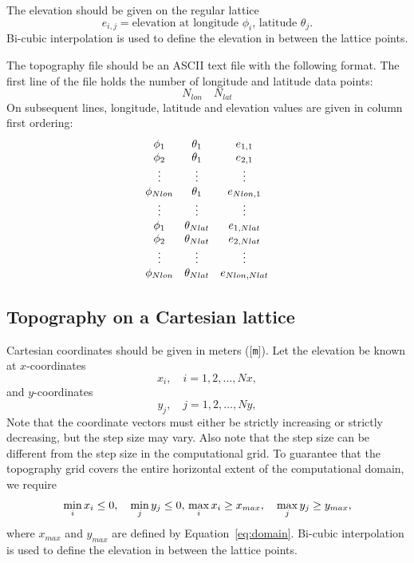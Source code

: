 \documentclass[11pt]{report}
\begin{document}
{The elevation should be given on the regular lattice
\[
	e_{i,j} = \mbox{elevation at longitude $\phi_i$, latitude $\theta_j$.}
\]
Bi-cubic interpolation is used to define the elevation in between the lattice points.

The topography file should be an ASCII text file with the following format. The first line of the
file holds the number of longitude and latitude data points:
\[
	N_{lon}\quad N_{lat}
\]
On subsequent lines, longitude, latitude and elevation values are given in column first ordering:
\[
	\begin{array}{c c c}
		\phi_1      & \theta_1      & e_{1,1}       \\
		\phi_2      & \theta_1      & e_{2,1}       \\
		\vdots      & \vdots        & \vdots        \\
		\phi_{Nlon} & \theta_1      & e_{Nlon,1}    \\
		\vdots      & \vdots        & \vdots        \\
		\phi_1      & \theta_{Nlat} & e_{1,Nlat}    \\
		\phi_2      & \theta_{Nlat} & e_{2,Nlat}    \\
		\vdots      & \vdots        & \vdots        \\
		\phi_{Nlon} & \theta_{Nlat} & e_{Nlon,Nlat}
	\end{array}
\]

\subsection{Topography on a Cartesian lattice}
Cartesian coordinates should be given in meters ([{\tt m}]). Let the elevation be known at $x$-coordinates
\[
	x_i,\quad i=1,2,\ldots,Nx,
\]
and $y$-coordinates
\[
	y_j,\quad j=1,2,\ldots,Ny,
\]
Note that the coordinate vectors must either be strictly increasing or strictly
decreasing, but the step size may vary. Also note that the step size can be different from the step
size in the computational grid. To guarantee that the topography grid covers the entire horizontal
extent of the computational domain, we require
\[
	\min_i x_i \leq 0,\quad \min_j y_j \leq 0,\\
	\max_i x_i \geq x_{max},\quad \max_j y_j \geq y_{max},
\]
where $x_{max}$ and $y_{max}$ are defined by Equation~\eqref{eq:domain}. Bi-cubic interpolation is
used to define the elevation in between the lattice points.

}
\end{document}
